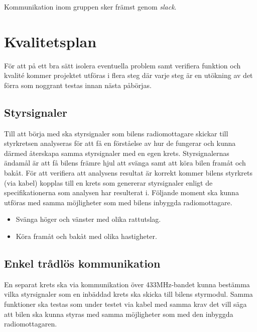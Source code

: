 \documentclass[a4paper]{article}
\begin{document}
\vspace{5mm}
\noindent Kommunikation inom gruppen sker främst genom {\it slack}.


\section{Kvalitetsplan}
För att på ett bra sätt isolera eventuella problem samt verifiera funktion och kvalité kommer projektet utföras i flera steg där varje steg är en utökning av det förra som noggrant testas innan nästa påbörjas. 


\subsection{Styrsignaler}
Till att börja med ska styrsignaler som bilens radiomottagare skickar till styrkretsen analyseras för att få en förståelse av hur de fungerar och kunna därmed återskapa samma styrsignaler med en egen krets. Styrsignalernas ändamål är att få bilens främre hjul att svänga samt att köra bilen framåt och bakåt. För att verifiera att analysens resultat är korrekt kommer bilens styrkrets (via kabel) kopplas till en krets som genererar styrsignaler enligt de specifikationerna som analysen har resulterat i. Följande moment ska kunna utföras med samma möjligheter som med bilens inbyggda radiomottagare.

\begin{itemize}  
    \item Svänga höger och vänster med olika rattutslag.
    \item Köra framåt och bakåt med olika hastigheter.
\end{itemize}

\subsection{Enkel trådlös kommunikation}
En separat krets ska via kommunikation över 433MHz-bandet kunna bestämma vilka styrsignaler som en inbäddad krets ska skicka till bilens styrmodul. Samma funktioner ska testas som under testet via kabel med samma krav det vill säga att bilen ska kunna styras med samma möjligheter som med den inbyggda radiomottagaren.
\end{document}
